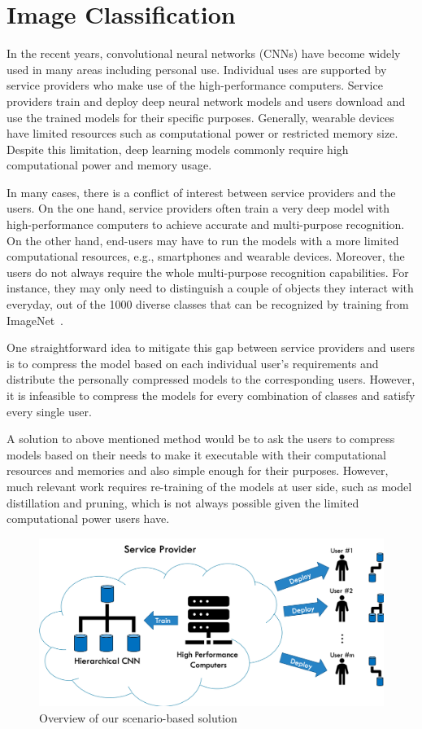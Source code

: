\section{Image Classification}

In the recent years, convolutional neural networks (CNNs) have become widely used in many areas including personal use. 
Individual uses are supported by service providers who make use of the high-performance computers. 
Service providers train and deploy deep neural network models and 
users download and use the trained models for their specific purposes.
Generally, wearable devices have limited resources such as computational power or restricted memory size. 
Despite this limitation, deep learning models commonly require high computational power and memory usage.

In many cases, there is a conflict of interest between service providers and the users.
On the one hand, service providers often train a very deep model with high-performance computers to achieve accurate and multi-purpose recognition. 
On the other hand, end-users may have to run the models with a more limited computational resources, e.g., smartphones and wearable devices. 
Moreover, the users do not always require the whole multi-purpose recognition capabilities. 
For instance, they may only need to distinguish a couple of objects they interact with everyday, out of the 1000 diverse classes that can be recognized by training from ImageNet~\cite{deng2009imagenet}.

One straightforward idea to mitigate this gap between service providers and users is 
to compress the model based on each individual user's requirements and 
distribute the personally compressed models to the corresponding users. 
However, it is infeasible to compress the models for every combination of classes and satisfy every single user. 

A solution to above mentioned method would be to ask the users to compress models based on their needs to make it executable with their computational resources and memories and also simple enough for their purposes. 
However, much relevant work requires re-training of the models at user side, 
such as model distillation and pruning, 
which is not always possible given the limited computational power users have.

\begin{figure}
    \centering
    \includegraphics[width=.7\textwidth]{images/ArchitectureOverview(ver2).png}
    \caption{Overview of our scenario-based solution}
    \label{fig:overview}
\end{figure}

